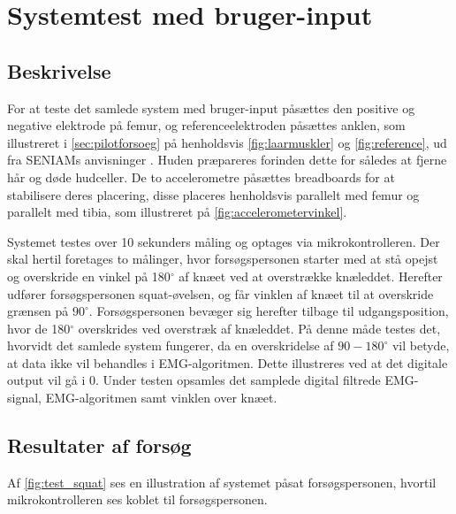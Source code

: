 \section{Systemtest med bruger-input}

\subsection{Beskrivelse}
For at teste det samlede system med bruger-input påsættes den positive og negative elektrode på femur, og referenceelektroden påsættes anklen, som illustreret i \autoref{sec:pilotforsoeg} på henholdsvis \autoref{fig:laarmuskler} og \autoref{fig:reference}, ud fra SENIAMs anvisninger \citep{seniam2016}. Huden præpareres forinden dette for således at fjerne hår og døde hudceller. 
De to accelerometre påsættes breadboards for at stabilisere deres placering, disse placeres henholdsvis parallelt med femur og parallelt med tibia, som illustreret på \autoref{fig:accelerometervinkel}.

Systemet testes over 10 sekunders måling og optages via mikrokontrolleren. Der skal hertil foretages to målinger, hvor forsøgspersonen starter med at stå opejst og overskride en vinkel på 180$^{\circ}$ af knæet ved at overstrække knæleddet. Herefter udfører forsøgspersonen squat-øvelsen, og får vinklen af knæet til at overskride grænsen på $90^{\circ}$. Forsøgspersonen bevæger sig herefter tilbage til udgangsposition, hvor de 180$^{\circ}$ overskrides ved overstræk af knæleddet.
På denne måde testes det, hvorvidt det samlede system fungerer, da en overskridelse af $90-180^{\circ}$ vil betyde, at data ikke vil behandles i EMG-algoritmen. Dette illustreres ved at det digitale output vil gå i 0. Under testen opsamles det samplede digital filtrede EMG-signal, EMG-algoritmen samt vinklen over knæet.

\subsection{Resultater af forsøg}

Af \ref{fig:test_squat} ses en illustration af systemet påsat forsøgspersonen, hvortil mikrokontrolleren ses koblet til forsøgspersonen.

